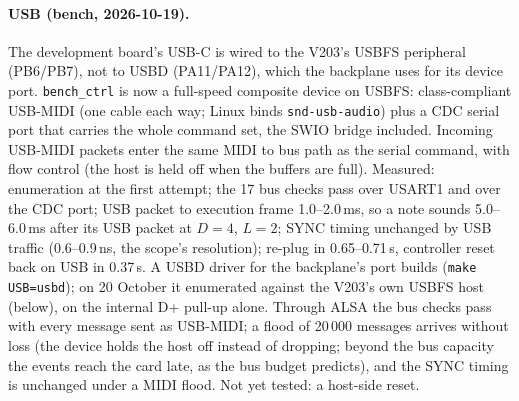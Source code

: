 \documentclass[11pt,a4paper]{article}
\newcommand{\file}[1]{\texttt{#1}}
\begin{document}
\paragraph{USB (bench, 2026-10-19).} The development board's USB-C is wired to the V203's USBFS peripheral (PB6/PB7),
not to USBD (PA11/PA12), which the backplane uses for its device port. \file{bench\_ctrl} is now a full-speed composite
device on USBFS: class-compliant USB-MIDI (one cable each way; Linux binds \texttt{snd-usb-audio}) plus a CDC serial
port that carries the whole command set, the SWIO bridge included. Incoming USB-MIDI packets enter the same MIDI to
bus path as the serial command, with flow control (the host is held off when the buffers are full). Measured:
enumeration at the first attempt; the 17 bus checks pass over USART1 and over the CDC port; USB packet to execution
frame 1.0--2.0\,ms, so a note sounds 5.0--6.0\,ms after its USB packet at $D = 4$, $L = 2$; SYNC timing unchanged by
USB traffic (0.6--0.9\,ns, the scope's resolution); re-plug in 0.65--0.71\,s, controller reset back on USB in
0.37\,s. A USBD driver for the backplane's port builds (\texttt{make USB=usbd}); on 20 October it enumerated against
the V203's own USBFS host (below), on the internal D+ pull-up alone. Through ALSA the bus checks pass with every message sent as USB-MIDI; a flood of
20\,000 messages arrives without loss (the device holds the host off instead of dropping; beyond the bus capacity
the events reach the card late, as the bus budget predicts), and the SYNC timing is unchanged under a MIDI flood.
Not yet tested: a host-side reset.
\end{document}
